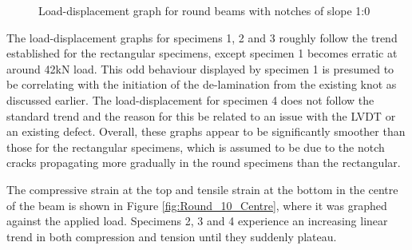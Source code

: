 \documentclass[11pt,a4paper]{article}
\numberwithin{equation}{subsection}
\begin{document}
\vspace*{\baselineskip}

\begin{figure}[h]
	\begin{center}
	\end{center}
	\caption{Load-displacement graph for round beams with notches of slope 1:0}
	\label{fig:Round_10_def}
\end{figure}

\noindent
The load-displacement graphs for specimens 1, 2 and 3 roughly follow the trend established for the rectangular specimens, except specimen 1 becomes erratic at around 42kN load. This odd behaviour displayed by specimen 1 is presumed to be correlating with the initiation of the de-lamination from the existing knot as discussed earlier. The load-displacement for specimen 4 does not follow the standard trend and the reason for this be related to an issue with the LVDT or an existing defect. Overall, these graphs appear to be significantly smoother than those for the rectangular specimens, which is assumed to be due to the notch cracks propagating more gradually in the round specimens than the rectangular.

\vspace*{\baselineskip}

\noindent
The compressive strain at the top and tensile strain at the bottom in the centre of the beam is shown in Figure \ref{fig:Round_10_Centre}, where it was graphed against the applied load. Specimens 2, 3 and 4 experience an increasing linear trend in both compression and tension until they suddenly plateau. 

\vspace*{\baselineskip}
\end{document}
